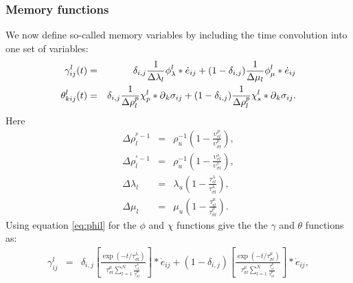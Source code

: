 \documentclass[11pt]{article}
\begin{document}
\subsubsection{Memory functions} 
We now define so-called memory variables by including the time 
convolution into one set of variables:
\begin{eqnarray}
 \gamma^l_{ij}(t) 
  & =& \delta_{i,j}\frac{1}{\Delta\lambda_l}\phi^l_{\lambda}*\dot{e}_{ij}  
    +  (1-\delta_{i,j})\frac{1}{\Delta\mu_l}\phi^l_{\mu}*\dot{e}_{ij}    \\  
 \theta^l_{kij}(t) 
  & =& \delta_{i,j}\frac{1}{\Delta\rho^p_l}
       \chi^l_{p}*\mbox{$\partial$}_k\sigma_{ij} 
       +(1-\delta_{i,j})\frac{1}{\Delta\rho^p_l}
       \chi^l_{s}*\mbox{$\partial$}_k\sigma_{ij} .  
\end{eqnarray}
Here 
\begin{eqnarray}
  \Delta\rho^{^{p}-1}_l 
     & = & \rho^{-1}_u\left(1-\frac{\upsilon^{p}_{\epsilon l}}
                           {\upsilon^{p}_{\sigma l}}\right),\nonumber \\
  \Delta\rho^{^{s}-1}_l 
     & = & \rho^{-1}_u\left(1-\frac{\upsilon^{s}_{\epsilon l}}
                           {\upsilon^{s}_{\sigma l}}\right),\nonumber \\
 \Delta\lambda_l                              
     & = & \lambda_u\left(1-\frac{\tau^{\lambda}_{\epsilon l}}
                           {\tau^{\lambda}_{\sigma l}}\right),  \nonumber \\
 \Delta\mu_l                              
     & = & \mu_u\left(1-\frac{\tau^{\mu}_{\epsilon l}}
                              {\tau^{\rho}_{\sigma l}}\right).    
\end{eqnarray}
Using equation \eqref{eq:phil}  for the $\phi$ and $\chi$ functions
give the the $\gamma$ and $\theta$ functions as:
\begin{eqnarray}
 \gamma^l_{ij}    
   & = & \delta_{i,j}\left[\frac{\exp(-t/\tau^{\lambda}_{\sigma l})}
                     {\tau^{\mu}_{\sigma l}
                     \sum_{l=1}^N \frac{\tau^{\lambda}_{\epsilon l}}
                     {\tau^{\mu}_{\sigma l}}}\right] 
                     *\dot{e}_{ij}    
    +  (1-\delta_{i,j})\left[\frac{\exp(-t/\tau^{\mu}_{\sigma l})}
                     {\tau^{\mu}_{\sigma l}
                     \sum_{l=1}^N \frac{\tau^{\mu}_{\epsilon l}}
                     {\tau^{\mu}_{\sigma l}}}\right] 
                     *\dot{e}_{ij},    
\end{eqnarray}
\end{document}
